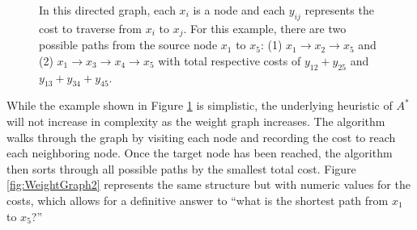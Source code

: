 \documentclass[
]{article}
\begin{document}
\begin{figure}[H]
\centering
    \caption{In this directed graph, each $x_i$ is a node and each $y_{ij}$ represents the cost to traverse from $x_i$ to $x_j$. For this example, there are two possible paths from the source node $x_1$ to $x_5$: (1) $x_1 \rightarrow x_2 \rightarrow x_5$ and (2) $x_1 \rightarrow x_3 \rightarrow x_4 \rightarrow x_5$ with total respective costs of $y_{12}+y_{25}$ and $y_{13}+y_{34}+y_{45}$. }
    \label{fig:weightedGraph}
\end{figure}

While the example shown in Figure \ref{fig:weightedGraph} is simplistic,
the underlying heuristic of \(A^*\) will not increase in complexity as
the weight graph increases. The algorithm walks through the graph by
visiting each node and recording the cost to reach each neighboring
node. Once the target node has been reached, the algorithm then sorts
through all possible paths by the smallest total cost. Figure
\ref{fig:WeightGraph2} represents the same structure but with numeric
values for the costs, which allows for a definitive answer to ``what is
the shortest path from \(x_1\) to \(x_5\)?''
\end{document}
